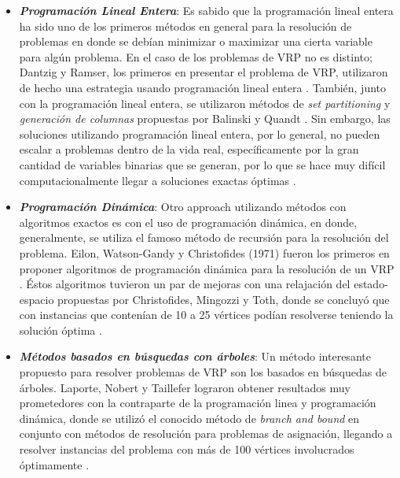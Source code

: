 \documentclass[letter, 10pt]{article}
\begin{document}
\begin{itemize}
  \item \textbf{\emph{Programación Lineal Entera}}: Es sabido que la programación lineal entera ha sido uno de los primeros métodos en general para la resolución de problemas en donde se debían minimizar o maximizar una cierta variable para algún problema. En el caso de los problemas de VRP no es distinto; Dantzig y Ramser, los primeros en presentar el problema de VRP, utilizaron de hecho una estrategia usando programación lineal entera \cite{RePEc:inm:ormnsc:v:6:y:1959:i:1:p:80-91}. También, junto con la programación lineal entera, se utilizaron métodos de \emph{set partitioning} y \emph{generación de columnas} propuestas por Balinski y Quandt \cite{BALINSKIQUANDT}. Sin embargo, las soluciones utilizando programación lineal entera, por lo general, no pueden escalar a problemas dentro de la vida real, específicamente por la gran cantidad de variables binarias que se generan, por lo que se hace muy difícil computacionalmente llegar a soluciones exactas óptimas \cite{LAPORTE1992345}.
  
    \item \textbf{\emph{Programación Dinámica}}: Otro approach utilizando métodos con algoritmos exactos es con el uso de programación dinámica, en donde, generalmente, se utiliza el famoso método de recursión para la resolución del problema. Eilon, Watson-Gandy y Christofides (1971) fueron los primeros en proponer algoritmos de programación dinámica para la resolución de un VRP \cite{Burrows1972DistributionMM}. Éstos algoritmos tuvieron un par de mejoras con una relajación del estado-espacio propuestas por Christofides, Mingozzi y Toth, donde se concluyó que con instancias que contenían de 10 a 25 vértices podían resolverse teniendo la solución óptima \cite{CHRISTOFIDESNICOSMINGOZZITOTH}.
    
    \item \textbf{\emph{Métodos basados en búsquedas con árboles}}: Un método interesante propuesto para resolver problemas de VRP son los basados en búsquedas de árboles.  Laporte, Nobert y Taillefer lograron obtener resultados muy prometedores con la contraparte de la programación linea y programación dinámica, donde se utilizó el conocido método de \emph{branch and bound} en conjunto con métodos de resolución para problemas de asignación, llegando a resolver instancias del problema con más de 100 vértices involucrados óptimamente \cite{LAPORTE1987857}.

\end{itemize}
\end{document}
